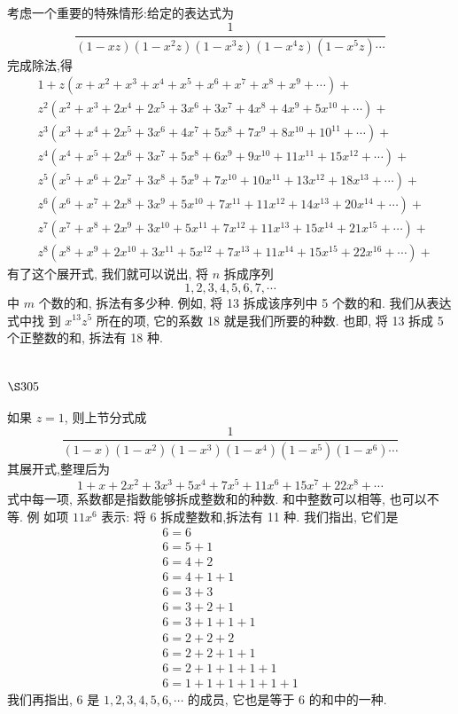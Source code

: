 考虑一个重要的特殊情形:给定的表达式为
\[
\frac{1}{(1-x z)\left(1-x^{2} z\right)\left(1-x^{3} z\right)\left(1-x^{4} z\right)\left(1-x^{5} z\right) \cdots}
\]
完成除法,得
\[
\begin{aligned}
& 1+z\left(x+x^{2}+x^{3}+x^{4}+x^{5}+x^{6}+x^{7}+x^{8}+x^{9}+\cdots\right)+ \\
& z^{2}\left(x^{2}+x^{3}+2 x^{4}+2 x^{5}+3 x^{6}+3 x^{7}+4 x^{8}+4 x^{9}+5 x^{10}+\cdots\right)+ \\
& z^{3}\left(x^{3}+x^{4}+2 x^{5}+3 x^{6}+4 x^{7}+5 x^{8}+7 x^{9}+8 x^{10}+10^{11}+\cdots\right)+ \\
& z^{4}\left(x^{4}+x^{5}+2 x^{6}+3 x^{7}+5 x^{8}+6 x^{9}+9 x^{10}+11 x^{11}+15 x^{12}+\cdots\right)+ \\
& z^{5}\left(x^{5}+x^{6}+2 x^{7}+3 x^{8}+5 x^{9}+7 x^{10}+10 x^{11}+13 x^{12}+18 x^{13}+\cdots\right)+ \\
& z^{6}\left(x^{6}+x^{7}+2 x^{8}+3 x^{9}+5 x^{10}+7 x^{11}+11 x^{12}+14 x^{13}+20 x^{14}+\cdots\right)+ \\
& z^{7}\left(x^{7}+x^{8}+2 x^{9}+3 x^{10}+5 x^{11}+7 x^{12}+11 x^{13}+15 x^{14}+21 x^{15}+\cdots\right)+ \\
& z^{8}\left(x^{8}+x^{9}+2 x^{10}+3 x^{11}+5 x^{12}+7 x^{13}+11 x^{14}+15 x^{15}+22 x^{16}+\cdots\right)+
\end{aligned}
\]
有了这个展开式, 我们就可以说出, 将 $n$ 拆成序列
\[
1,2,3,4,5,6,7, \cdots
\]
中 $m$ 个数的和, 拆法有多少种. 例如, 将 13 拆成该序列中 5 个数的和. 我们从表达式中找 到 $x^{13} z^{5}$ 所在的项, 它的系数 18 就是我们所要的种数. 也即, 将 13 拆成 5 个正整数的和, 拆法有 18 种.

\section{$\S 305$}

如果 $z=1$, 则上节分式成
\[
\frac{1}{(1-x)\left(1-x^{2}\right)\left(1-x^{3}\right)\left(1-x^{4}\right)\left(1-x^{5}\right)\left(1-x^{6}\right) \cdots}
\]
其展开式,整理后为
\[
1+x+2 x^{2}+3 x^{3}+5 x^{4}+7 x^{5}+11 x^{6}+15 x^{7}+22 x^{8}+\cdots
\]
式中每一项, 系数都是指数能够拆成整数和的种数. 和中整数可以相等, 也可以不等. 例 如项 $11 x^{6}$ 表示: 将 6 拆成整数和,拆法有 11 种. 我们指出, 它们是
\[
\begin{gathered}
6=6 \\
6=5+1 \\
6=4+2 \\
6=4+1+1 \\
6=3+3 \\
6=3+2+1 \\
6=3+1+1+1 \\
6=2+2+2 \\
6=2+2+1+1 \\
6=2+1+1+1+1 \\
6=1+1+1+1+1+1
\end{gathered}
\]
我们再指出, 6 是 $1,2,3,4,5,6, \cdots$ 的成员, 它也是等于 6 的和中的一种.


